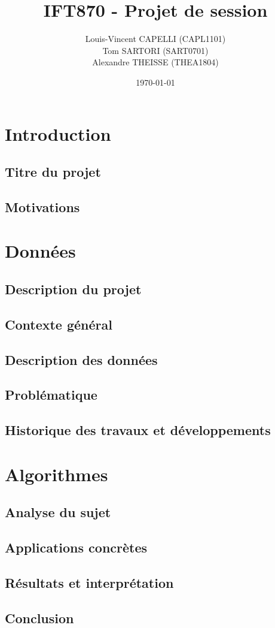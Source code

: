 \documentclass[12pt]{article}
\title{IFT870 - Projet de session}
\author{Louis-Vincent CAPELLI (CAPL1101) \\ 
        Tom SARTORI (SART0701) \\
        Alexandre THEISSE (THEA1804)}
\date{\today}
\begin{document}
\maketitle

\section{Introduction}
\subsection{Titre du projet}

\subsection{Motivations}

\section{Données}
\subsection{Description du projet}
\subsection{Contexte général}
\subsection{Description des données}
\cite{climate_classification}
\subsection{Problématique}
\subsection{Historique des travaux et développements}

\section{Algorithmes}
\subsection{Analyse du sujet}
\subsection{Applications concrètes}
\subsection{Résultats et interprétation}
\subsection{Conclusion}



\end{document}
